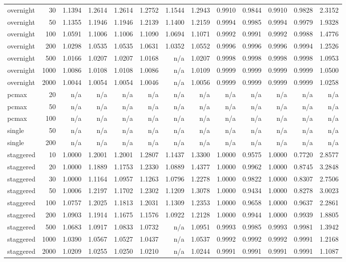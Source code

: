 \begin{table}[htbp]
\begin{tabular}{lrrrrrrrrrrrr}
overnight & 30 & 1.1394 & 1.2614 & 1.2614 & 1.2752 & 1.1544 & 1.2943 & 0.9910 & 0.9844 & 0.9910 & 0.9828 & 2.3152 \\
overnight & 50 & 1.1355 & 1.1946 & 1.1946 & 1.2139 & 1.1400 & 1.2159 & 0.9994 & 0.9985 & 0.9994 & 0.9979 & 1.9328 \\
overnight & 100 & 1.0591 & 1.1006 & 1.1006 & 1.1090 & 1.0694 & 1.1071 & 0.9992 & 0.9991 & 0.9992 & 0.9988 & 1.4776 \\
overnight & 200 & 1.0298 & 1.0535 & 1.0535 & 1.0631 & 1.0352 & 1.0552 & 0.9996 & 0.9996 & 0.9996 & 0.9994 & 1.2526 \\
overnight & 500 & 1.0166 & 1.0207 & 1.0207 & 1.0168 & n/a & 1.0207 & 0.9998 & 0.9998 & 0.9998 & 0.9998 & 1.0953 \\
overnight & 1000 & 1.0086 & 1.0108 & 1.0108 & 1.0086 & n/a & 1.0109 & 0.9999 & 0.9999 & 0.9999 & 0.9999 & 1.0500 \\
overnight & 2000 & 1.0044 & 1.0054 & 1.0054 & 1.0046 & n/a & 1.0056 & 0.9999 & 0.9999 & 0.9999 & 0.9999 & 1.0258 \\
pcmax & 20 & n/a & n/a & n/a & n/a & n/a & n/a & n/a & n/a & n/a & n/a & n/a \\
pcmax & 50 & n/a & n/a & n/a & n/a & n/a & n/a & n/a & n/a & n/a & n/a & n/a \\
pcmax & 100 & n/a & n/a & n/a & n/a & n/a & n/a & n/a & n/a & n/a & n/a & n/a \\
single & 50 & n/a & n/a & n/a & n/a & n/a & n/a & n/a & n/a & n/a & n/a & n/a \\
single & 200 & n/a & n/a & n/a & n/a & n/a & n/a & n/a & n/a & n/a & n/a & n/a \\
staggered & 10 & 1.0000 & 1.2001 & 1.2001 & 1.2807 & 1.1437 & 1.3300 & 1.0000 & 0.9575 & 1.0000 & 0.7720 & 2.8577 \\
staggered & 20 & 1.0000 & 1.1889 & 1.1753 & 1.2330 & 1.0889 & 1.4377 & 1.0000 & 0.9962 & 1.0000 & 0.8745 & 3.2848 \\
staggered & 30 & 1.0000 & 1.1164 & 1.0957 & 1.1263 & 1.0796 & 1.2278 & 1.0000 & 0.9822 & 1.0000 & 0.8307 & 2.7506 \\
staggered & 50 & 1.0006 & 1.2197 & 1.1702 & 1.2302 & 1.1209 & 1.3078 & 1.0000 & 0.9434 & 1.0000 & 0.8278 & 3.0023 \\
staggered & 100 & 1.0757 & 1.2025 & 1.1813 & 1.2031 & 1.1309 & 1.2353 & 1.0000 & 0.9658 & 1.0000 & 0.9637 & 2.2861 \\
staggered & 200 & 1.0903 & 1.1914 & 1.1675 & 1.1576 & 1.0922 & 1.2128 & 1.0000 & 0.9944 & 1.0000 & 0.9939 & 1.8805 \\
staggered & 500 & 1.0683 & 1.0917 & 1.0833 & 1.0732 & n/a & 1.0951 & 0.9993 & 0.9985 & 0.9993 & 0.9981 & 1.3942 \\
staggered & 1000 & 1.0390 & 1.0567 & 1.0527 & 1.0437 & n/a & 1.0537 & 0.9992 & 0.9992 & 0.9992 & 0.9991 & 1.2168 \\
staggered & 2000 & 1.0209 & 1.0255 & 1.0250 & 1.0210 & n/a & 1.0244 & 0.9991 & 0.9991 & 0.9991 & 0.9991 & 1.1087 \\
\bottomrule
\end{tabular}
\end{table}
